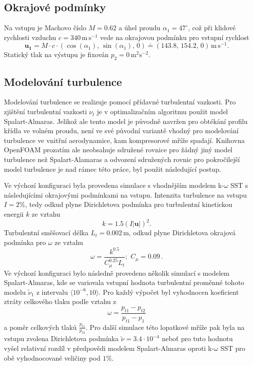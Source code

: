\subsection{Okrajové podmínky}  Na vstupu je Machovo číslo $ M=0.62 $ a úhel proudu $ \alpha_1 = 47^\circ $, což při klidové rychlosti vzduchu $ c=340 \,\mathrm{m\,s^{-1}} $ vede na okrajovou podmínku pro vstupní rychlost  
\begin{equation}\label{key}
\mathbf{u_1}=M\cdot c \cdot (\cos(\alpha_1),\, \sin(\alpha_1),\, 0) \doteq (143.8,\, 154.2,\, 0)\, \mathrm{m\,s^{-1}}.
\end{equation}
Statický tlak na výstupu je fixován $ p_2=0\,\mathrm{m^2s^{-2}} $.

\subsection{Modelování turbulence}
Modelování turbulence se realizuje pomocí přídavné turbulentní vazkosti. Pro zjištění turbulentní vazkosti $ \nu_t $ je v optimalizačním algoritmu použit model Spalart-Almaras. Jelikož ale tento model je původně navržen pro obtékání profilu křídla ve volném proudu, není ve své původní variantě vhodný pro modelování turbulence ve vnitřní aerodynamice, kam kompresorové mříže spadají. Knihovna OpenFOAM prozatím ale neobsahuje sdružené rovnice pro žádný jiný model turbulence než Spalart-Alamaras a odvození sdružených rovnic pro pokročilejší model turbulence je nad rámec této práce, byl použit následující postup. 

Ve výchozí konfiguraci byla provedena simulace s vhodnějším modelem k-$ \omega $ SST s následujícími okrajovými podmínkami na vstupu. Intenzita turbulence na vstupu $ I=2\% $, tedy odkud plyne Dirichletova podmínka pro turbulentní kinetickou energii $ k $ ze vztahu  \begin{equation}\label{key}
k=1.5(I|\mathbf{u}|)^2.
\end{equation} 
Turbulentní směšovací délka $ L_t=0.002\,\mathrm{m} $, odkud plyne Dirichletova okrajová podmínka pro $ \omega $ ze vztahu
\begin{equation}\label{key}
\omega=\dfrac{k^{0.5}}{C_\mu^{0.25}L_t};\,\, C_\mu=0.09\,.
\end{equation} 
Ve výchozí konfiguraci bylo následně provedeno několik simulací s modelem Spalart-Almaras, kde se variovala vstupní hodnota turbulentní proměnné tohoto modelu $ \tilde{\nu}_1 $ z intervalu $ \langle 10^{-6},10 \rangle $. Pro každý výpočet byl vyhodnocen koeficient ztráty celkového tlaku podle vztahu z \cite{steinert1990design}
\begin{equation}\label{key}
\omega = \dfrac{p_{t1}-p_{t2}}{p_{t1}-p_1}
\end{equation}
a poměr celkových tlaků $ \frac{p_{t1}}{p_{t2}} $. Pro další simulace této lopatkové mříže pak byla na vstupu zvolena Dirichletova podmínka $ \tilde{\nu} = 3.4\cdot 10^{-4} $ neboť pro tuto hodnotu vyšel relativní rozdíl v předpovědi modelem Spalart-Almaras oproti k-$ \omega $ SST pro obě vyhodnocované veličiny pod $ 1\% $.

